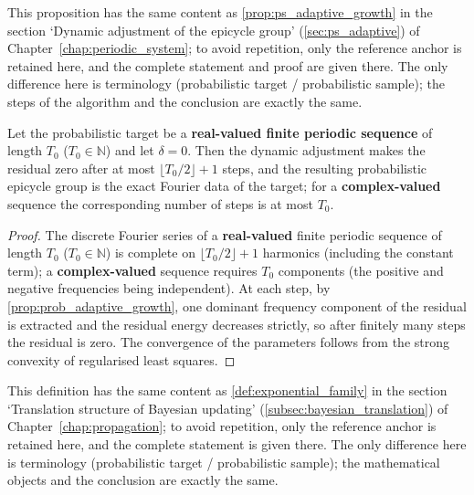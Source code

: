 \begin{proposition}\label{prop:prob_adaptive_growth}
This proposition has the same content as \cref{prop:ps_adaptive_growth} in the section `Dynamic adjustment of the epicycle group' (\cref{sec:ps_adaptive}) of Chapter~\ref{chap:periodic_system}; to avoid repetition, only the reference anchor is retained here, and the complete statement and proof are given there. The only difference here is terminology (probabilistic target / probabilistic sample); the steps of the algorithm and the conclusion are exactly the same.
\end{proposition}

\begin{theorem}\label{thm:prob_adaptive_convergence}
Let the probabilistic target be a \textbf{real-valued finite periodic sequence} of length $T_0$ ($T_0\in\mathbb N$) and let $\delta=0$. Then the dynamic adjustment makes the residual zero after at most $\lfloor T_0/2\rfloor+1$ steps, and the resulting probabilistic epicycle group is the exact Fourier data of the target; for a \textbf{complex-valued} sequence the corresponding number of steps is at most $T_0$.
\end{theorem}

\begin{proof}
The discrete Fourier series of a \textbf{real-valued} finite periodic sequence of length $T_0$ ($T_0\in\mathbb N$) is complete on $\lfloor T_0/2\rfloor+1$ harmonics (including the constant term); a \textbf{complex-valued} sequence requires $T_0$ components (the positive and negative frequencies being independent). At each step, by \cref{prop:prob_adaptive_growth}, one dominant frequency component of the residual is extracted and the residual energy decreases strictly, so after finitely many steps the residual is zero. The convergence of the parameters follows from the strong convexity of regularised least squares.
\end{proof}

\begin{definition}\label{def:exp_family_prob}
This definition has the same content as \cref{def:exponential_family} in the section `Translation structure of Bayesian updating' (\cref{subsec:bayesian_translation}) of Chapter~\ref{chap:propagation}; to avoid repetition, only the reference anchor is retained here, and the complete statement is given there. The only difference here is terminology (probabilistic target / probabilistic sample); the mathematical objects and the conclusion are exactly the same.
\end{definition}

